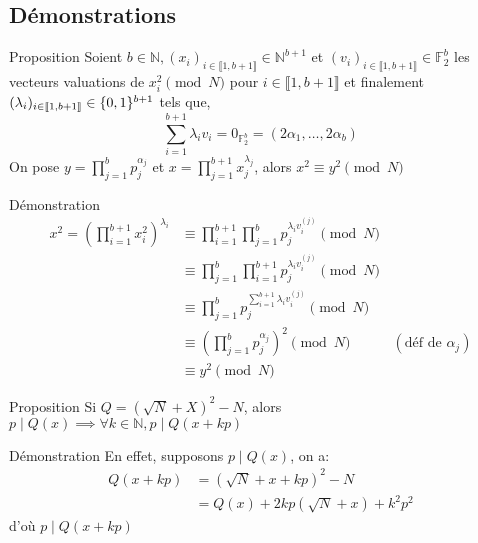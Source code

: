 \addtocounter{framenumber}{-1}
\subsection*{Démonstrations}

\begin{frame}
    \addtocounter{framenumber}{-1}
    \begin{block}{Proposition}
    Soient $b\in \mathbb N, (x_i)_{i\in \llbracket 1, b+1\rrbracket}\in \mathbb N^{b+1}$
    et $(v_i)_{i\in \llbracket 1, b+1\rrbracket}\in \mathbb F_2^b$ les vecteurs valuations de $x_i^2 \pmod N$ pour $i \in \llbracket 1,b+1 \rrbracket$
    et finalement $(\lambda_i)_{i \in \llbracket 1,b+1 \rrbracket}\in \mathbb \{0,1\}^{b+1}$ tels que,
    \[
    \sum_{i=1}^{b+1} \lambda_iv_i = 0_{\mathbb F_2^b} = (2\alpha_1, \dots, 2\alpha_b)
    \]
    \newline
    On pose $y = \prod_{j=1}^b p_j^{\alpha_j}$ et $x = \prod_{j=1}^{b+1}x_j^{\lambda_j}$, alors $x ^2 \equiv y ^2 \pmod N$
    \end{block}
\end{frame}

\begin{frame}
    \addtocounter{framenumber}{-1}
    \begin{block}{Démonstration}
        \begin{align*}
            x^2 = (\prod_{i=1}^{b+1} x_i^2)^{\lambda_i} &\equiv \prod_{i=1}^{b+1} \prod_{j=1}^b p_j^{\lambda_iv_i^{(j)}} \pmod N\\
            &\equiv \prod_{j=1}^b \prod_{i=1}^{b+1} p_j^{\lambda_iv_i^{(j)}} \pmod N\\
            &\equiv \prod_{j=1}^b p_j^{\sum_{i =1}^{b+1}\lambda_iv_i^{(j)}} \pmod N\\
            &\equiv (\prod_{j=1}^b p_j^{\alpha_j})^2 \pmod N \qquad\quad (\text{déf de } \alpha_j) \\ %
            &\equiv y^2 \pmod N
        \end{align*}
    \end{block}
\end{frame}

\begin{frame}
    \addtocounter{framenumber}{-1}
    \begin{block}{Proposition}
        Si $Q = (\sqrt N + X)^2 - N$, alors $p\mid Q(x) \implies \forall k\in \mathbb N,  p\mid Q(x+kp)$
    \end{block}
    \begin{block}{Démonstration}
    En effet, supposons $p\mid Q(x)$, on a:
    \begin{align*}
        Q(x+kp) &= (\sqrt N + x+kp)^2 - N \\
                &= Q(x) + 2kp(\sqrt N + x) + k^2p^2
    \end{align*}
    d'où $p\mid Q(x+kp)$
    \end{block}
\end{frame}

